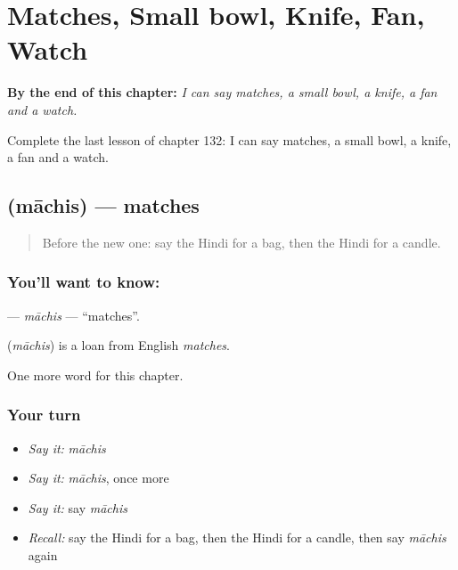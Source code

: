 
\chapter{Matches, Small bowl, Knife, Fan, Watch}
\label{ch:hi-matches-small-bowl-knife-fan-watch}

\begin{chapteropening}
\textbf{By the end of this chapter:} \emph{I can say matches, a small bowl, a knife, a fan and a watch.}

Complete the last lesson of chapter 132: I can say matches, a small bowl, a knife, a fan and a watch.
\end{chapteropening}

\section[\texorpdfstring{\hi{माचिस} (māchis)}{माचिस (māchis)}]{ (māchis) — matches}

\label{lesson:HI-C132-machis}



\begin{quote}
Before the new one: say the Hindi for a bag, then the Hindi for a candle.
\end{quote}

\subsection*{You'll want to know: }
\textbf{} — \emph{māchis} — \textquotedblleft{}matches\textquotedblright{}.

\begin{cousinweb}
\textbf{} (\emph{māchis}) is a loan from English \emph{matches}.
\end{cousinweb}

\begin{grammarlens}[title={What you've built}]
One more word for this chapter.
\end{grammarlens}

\subsection*{Your turn}
\begin{itemize}
\raggedright
  \item \emph{Say it:} \emph{māchis}
  \item \emph{Say it:} \emph{māchis}, once more
  \item \emph{Say it:} say \emph{māchis}
  \item \emph{Recall:} say the Hindi for a bag, then the Hindi for a candle, then say \emph{māchis} again
\end{itemize}

